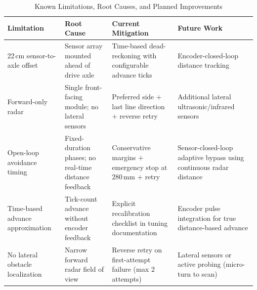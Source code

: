 
\begin{table}[!t]
\caption{Known Limitations, Root Causes, and Planned Improvements}
\label{tab:limitations}
\centering
\footnotesize
\begin{tabular}{@{}p{}p{}p{}p{}@{}}
\toprule
\textbf{Limitation} & \textbf{Root Cause} & \textbf{Current Mitigation} & \textbf{Future Work} \\
\midrule
22\,cm sensor-to-axle offset &
Sensor array mounted ahead of drive axle &
Time-based dead-reckoning with configurable advance ticks &
Encoder-closed-loop distance tracking \\
\midrule
Forward-only radar &
Single front-facing module; no lateral sensors &
Preferred side $+$ last line direction $+$ reverse retry &
Additional lateral ultrasonic/infrared sensors \\
\midrule
Open-loop avoidance timing &
Fixed-duration phases; no real-time distance feedback &
Conservative margins $+$ emergency stop at 280\,mm $+$ retry &
Sensor-closed-loop adaptive bypass using continuous radar distance \\
\midrule
Time-based advance approximation &
Tick-count advance without encoder feedback &
Explicit recalibration checklist in tuning documentation &
Encoder pulse integration for true distance-based advance \\
\midrule
No lateral obstacle localization &
Narrow forward radar field of view &
Reverse retry on first-attempt failure (max 2 attempts) &
Lateral sensors or active probing (micro-turn to scan) \\
\bottomrule
\end{tabular}
\end{table}

